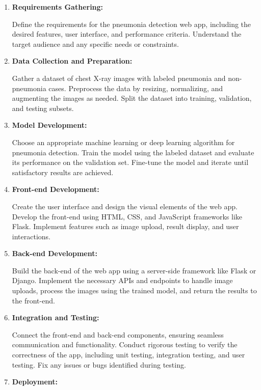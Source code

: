 \begin{enumerate} 
	
	\item \textbf {	Requirements Gathering:}
	
	Define the requirements for the pneumonia detection web app, including the desired features, user interface, and performance criteria. Understand the target audience and any specific needs or constraints.
	
	\item \textbf {	Data Collection and Preparation:}
	
	Gather a dataset of chest X-ray images with labeled pneumonia and non-pneumonia cases. Preprocess the data by resizing, normalizing, and augmenting the images as needed. Split the dataset into training, validation, and testing subsets.
	
	\item \textbf {	Model Development:}
	
	Choose an appropriate machine learning or deep learning algorithm for pneumonia detection. Train the model using the labeled dataset and evaluate its performance on the validation set. Fine-tune the model and iterate until satisfactory results are achieved.
	
	\item \textbf {	Front-end Development:}
	
	Create the user interface and design the visual elements of the web app. Develop the front-end using HTML, CSS, and JavaScript frameworks like Flask. Implement features such as image upload, result display, and user interactions.
	
	\item \textbf {Back-end Development:}
	
	Build the back-end of the web app using a server-side framework like Flask or Django. Implement the necessary APIs and endpoints to handle image uploads, process the images using the trained model, and return the results to the front-end.
	
	\item \textbf {Integration and Testing:}
	
	Connect the front-end and back-end components, ensuring seamless communication and functionality. Conduct rigorous testing to verify the correctness of the app, including unit testing, integration testing, and user testing. Fix any issues or bugs identified during testing.
	
	\item \textbf {Deployment:}
	

\end{enumerate}
